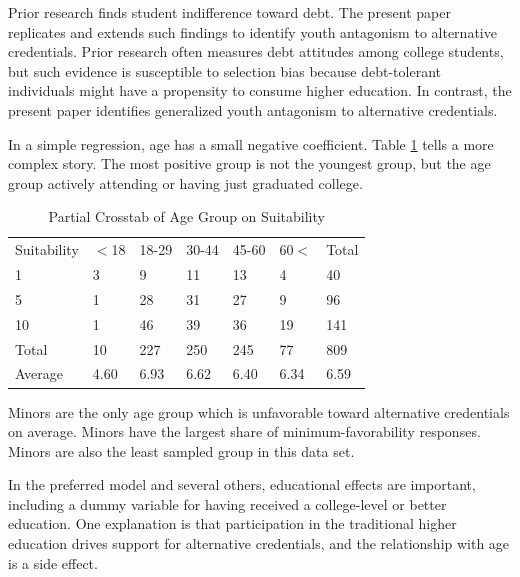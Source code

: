 \documentclass[AER]{./aea-latex-templates/AEA}
\begin{document}
        Prior research finds student indifference toward debt\cite{davies1995student}.
        The present paper replicates and extends such
        findings to identify youth antagonism to alternative credentials. Prior
        research often measures debt attitudes among college students, but such
        evidence is susceptible to selection bias because debt-tolerant
        individuals might have a propensity to consume higher education. In
        contrast, the present paper identifies generalized youth antagonism to
        alternative credentials.
        
        In a simple regression, age has a small negative coefficient.
        Table \ref{tab:partial_crosstab_voi_agegroup} tells a more complex story.
        The most positive group is not the youngest group, but the age group actively
        attending or having just graduated college.
        
        \begin{table}
            \caption{Partial Crosstab of Age Group on Suitability}
            \begin{tabular}{lllllll}
                Suitability & $<$18 & 18-29 & 30-44 & 45-60 & 60$<$ & Total \\
                1 & 3 & 9 & 11 & 13 & 4 & 40 \\
                5 & 1 & 28 & 31 & 27 & 9 & 96 \\
                10 & 1 & 46 & 39 & 36 & 19 & 141 \\
                Total & 10 & 227 & 250 & 245 & 77 & 809 \\
                Average & 4.60 & 6.93 & 6.62 & 6.40 & 6.34 & 6.59 %
            \end{tabular}
            \label{tab:partial_crosstab_voi_agegroup}
            \end{table}
        
        Minors are the only age group which is unfavorable toward alternative credentials on average.
        Minors have the largest share of minimum-favorability responses.
        Minors are also the least sampled group in this data set.
        
        In the preferred model and several others, educational effects are important, including a
        dummy variable for having received a college-level or better education.
        One explanation is that participation in the traditional higher education
        drives support for alternative credentials, and the relationship with age is a
        side effect.
        
\end{document}
